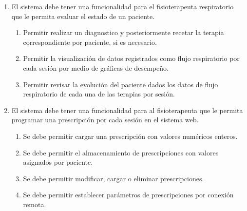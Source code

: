\documentclass[12pt]{article}
\begin{document}
\begin{enumerate}[start=1,label={\bfseries RF0\arabic*.}]

    \item El sistema debe tener una funcionalidad para el fisioterapeuta respiratorio que le permita evaluar el estado de un paciente. 
        \label{RF01}
            \begin{enumerate}[label*=\arabic*.]
                \item Permitir realizar un diagnostico y posteriormente recetar la terapia correspondiente por paciente, si es necesario.
                
                \item Permitir la visualización de datos registrados como flujo respiratorio por cada sesión por medio de gráficas de desempeño.
                
                \item Permitir revisar la evolución del paciente dados los datos de flujo respiratorio de cada una de las terapias por sesión.
        
            \end{enumerate}

    \item El sistema debe tener una funcionalidad para al fisioterapeuta que le permita programar  una prescripción por cada sesión en el sistema web.
        
        \label{RF02}
            \begin{enumerate}[label*=\arabic*.]
            
                \item Se debe permitir cargar una prescripción con valores numéricos enteros. %
                 
                \item Se debe permitir el almacenamiento de prescripciones con valores asignados por paciente. %
                
                \item Se debe permitir modificar, cargar o eliminar prescripciones.
                
                \item Se debe permitir establecer parámetros de prescripciones por conexión remota.
                

\end{enumerate}
\end{enumerate}
\end{document}
